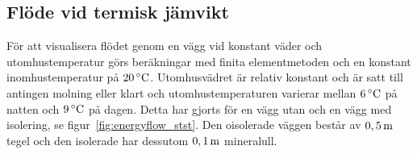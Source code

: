 \subsection{Flöde vid termisk jämvikt}
\label{sec:steadystatewall}



För att visualisera flödet genom en vägg vid konstant väder och utomhustemperatur görs 
beräkningar med finita elementmetoden och en konstant inomhustemperatur på 
$\unit[20]{^\circ C}$. Utomhusvädret är relativ konstant och är satt till antingen molning 
eller klart och utomhustemperaturen varierar mellan $\unit[6]{^\circ C}$ på natten och 
$\unit[9]{^\circ C}$ på dagen. Detta har gjorts för en vägg utan och en vägg med 
isolering, se figur~\ref{fig:energyflow_stst}. Den oisolerade väggen består av 
$\unit[0,5]{m}$ tegel och den isolerade har dessutom $\unit[0,1]{m}$ mineralull. 

